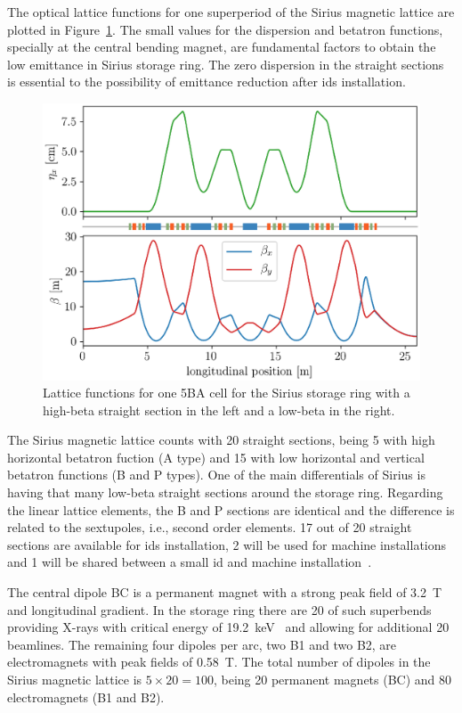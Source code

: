 The optical lattice functions for one superperiod of the Sirius magnetic lattice are plotted in Figure~\ref{fig:twiss_functions}. The small values for the dispersion and betatron functions, specially at the central bending magnet, are fundamental factors to obtain the low emittance in Sirius storage ring. The zero dispersion in the straight sections is essential to the possibility of emittance reduction after \glspl{id} installation.
\begin{figure}
    \centering
    \includegraphics[scale=1.0]{figures/twiss_plot_refine.eps}
    \caption{Lattice functions for one 5BA cell for the Sirius storage ring with a high-beta straight section in the left and a low-beta in the right.}
    \label{fig:twiss_functions}
\end{figure}

The Sirius magnetic lattice counts with 20 straight sections, being 5 with high horizontal betatron fuction (A type) and 15 with low horizontal and vertical betatron functions (B and P types). One of the main differentials of Sirius is having that many low-beta straight sections around the storage ring. Regarding the linear lattice elements, the B and P sections are identical and the difference is related to the sextupoles, i.e., second order elements. 17 out of 20 straight sections are available for \glspl{id} installation, 2 will be used for machine installations and 1 will be shared between a small \gls{id} and machine installation~\cite{liu2019}. 

The central dipole BC is a permanent magnet with a strong peak field of \SI{3.2}{\tesla} and longitudinal gradient. In the storage ring there are 20 of such superbends providing X-rays with critical energy of \SI{19.2}{\kilo\electronvolt}~\cite{Liu2016b} and allowing for additional 20 beamlines. The remaining four dipoles per arc, two B1 and two B2, are electromagnets with peak fields of \SI{0.58}{\tesla}. The total number of dipoles in the Sirius magnetic lattice is $5 \times 20 = 100$, being 20 permanent magnets (BC) and 80 electromagnets (B1 and B2).

